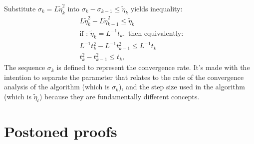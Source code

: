 \documentclass[12pt]{article}
\begin{document}
    \begin{observation}
        Substitute $\sigma_k = L \tilde \eta_k^2$ into $\sigma_k - \sigma_{k - 1} \le \tilde \eta_k$ yields inequality:
        \begin{align*}
            & L \tilde \eta_k^2 - L \tilde \eta_{k - 1}^2 
            \le 
            \tilde \eta_k
            \\
            & \text{if : }  \tilde \eta_k = L^{-1} t_k, \text{ then equivalently: }
            \\
            & L^{-1}t_k^2 - L^{-1}t_{k - 1}^2
            \le L^{-1}t_k 
            \\
            & 
            t_k^2 - t_{k - 1}^2
            \le t_k, 
        \end{align*}
        The sequence $\sigma_k$ is defined to represent the convergence rate. 
        It's made with the intention to separate the parameter that relates to the rate of the convergence analysis of the algorithm (which is $\sigma_k$), and the step size used in the algorithm (which is $\tilde \eta_t$) because they are fundamentally different concepts. 
    \end{observation}






\appendix
\section{Postoned proofs}
\end{document}
